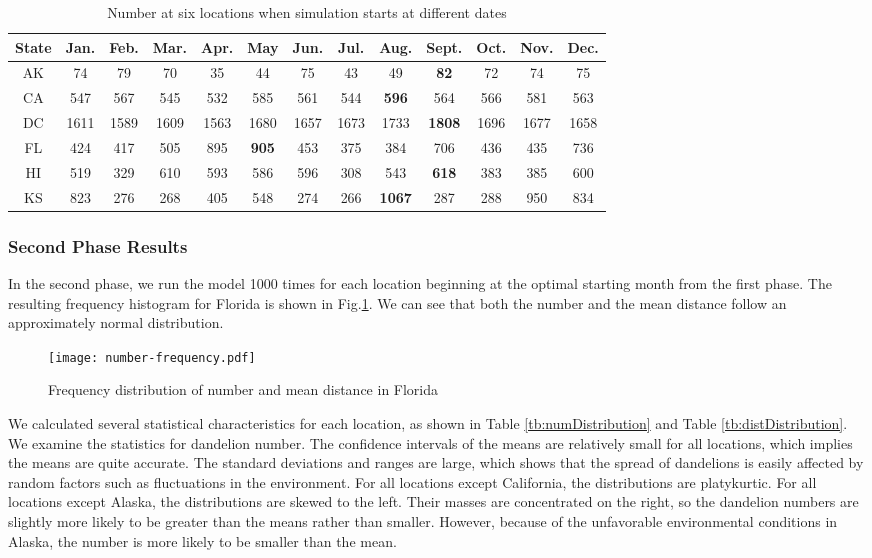 \documentclass[12pt]{article}
\begin{document}
			{
				\fontsize{10}{14}\selectfont
				{
					\begin{longtable}{ccccccccccccc}
						\caption{Number at six locations when simulation starts at different dates}
						\label{tb:start}\\
						\toprule
						State&Jan.&Feb.&Mar.&Apr.&May&Jun.&Jul.&Aug.&Sept.&Oct.&Nov.&Dec.\\
						\toprule
						AK&74&79&70&35&44&75&43&49&\color{blue}\textbf{82}&72&74&75\\
						CA&547&567&545&532&585&561&544&\color{blue}\textbf{596}&564&566&581&563\\
						DC&1611&1589&1609&1563&1680&1657&1673&1733&\color{blue}\textbf{1808}&1696&1677&1658\\
						FL&424&417&505&895&\color{blue}\textbf{905}&453&375&384&706&436&435&736\\
						HI&519&329&610&593&586&596&308&543&\color{blue}\textbf{618}&383&385&600\\
						KS&823&276&268&405&548&274&266&\color{blue}\textbf{1067}&287&288&950&834\\
						\bottomrule
					\end{longtable}
				}
			}
			
			
			
		\subsubsection{Second Phase Results}
		
			In the second phase, we run the model 1000 times for each location beginning at the optimal starting month from the first phase.  The resulting frequency histogram for Florida is shown in Fig.\ref{fig:freqDand}.  We can see that both the number and the mean distance follow an approximately normal distribution.  
			
			\begin{figure}[htbp]
				\centering
				\texttt{[image: number-frequency.pdf]}
				\caption{Frequency distribution of number and mean distance in Florida}
				\label{fig:freqDand}
			\end{figure}
			
			We calculated several statistical characteristics for each location, as shown in Table \ref{tb:numDistribution} and Table \ref{tb:distDistribution}.	 We examine the statistics for dandelion number.  The confidence intervals of the means are relatively small for all locations, which implies the means are quite accurate.  The standard deviations and ranges are large, which shows that the spread of dandelions is easily affected by random factors such as fluctuations in the environment.  For all locations except California, the distributions are platykurtic.  For all locations except Alaska, the distributions are skewed to the left.  Their masses are concentrated on the right, so the dandelion numbers are slightly more likely to be greater than the means rather than smaller.  However, because of the unfavorable environmental conditions in Alaska, the number is more likely to be smaller than the mean.
			
\end{document}

